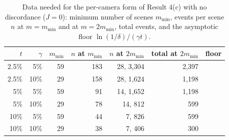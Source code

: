 \begin{table}[t]
\centering
\caption{Data needed for the per-camera form of Result 4(c) with no discordance ($J=0$): minimum number of scenes $m_{\min}$, events per scene $n$ at $m=m_{\min}$ and at $m=2m_{\min}$, total events, and the asymptotic floor $\ln(1/\delta)/(\gamma t)$.}
\label{tab:c4b}
\scriptsize
\setlength{\tabcolsep}{3pt}
\begin{tabular}{@{}rrrrrrr@{}}
\toprule
$t$ & $\gamma$ & $m_{\min}$ & $n$ at $m_{\min}$ & $n$ at $2m_{\min}$ & total at $2m_{\min}$ & floor \\
\midrule
2.5\% & 5\% & 59 & 183 & 28, 3,304 & 2,397 \\
2.5\% & 10\% & 29 & 158 & 28, 1,624 & 1,198 \\
5\% & 5\% & 59 & 91 & 14, 1,652 & 1,198 \\
5\% & 10\% & 29 & 78 & 14, 812 & 599 \\
10\% & 5\% & 59 & 44 & 7, 826 & 599 \\
10\% & 10\% & 29 & 38 & 7, 406 & 300 \\
\bottomrule
\end{tabular}
\end{table}
